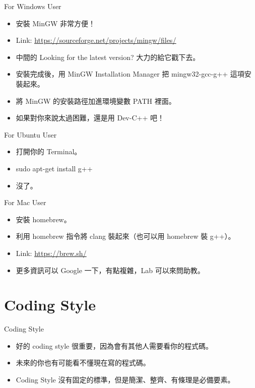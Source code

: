 \documentclass[t]{beamer}
\begin{document}
\begin{frame}{For Windows User}
  \begin{itemize}
    \item 安裝 MinGW 非常方便！
    \item Link: \href{https://sourceforge.net/projects/mingw/files/}{\underline{https://sourceforge.net/projects/mingw/files/}}
    \item 中間的 Looking for the latest version? 大力的給它戳下去。
    \item 安裝完成後，用 MinGW Installation Manager 把 mingw32-gcc-g++ 這項安裝起來。
    \item 將 MinGW 的安裝路徑加進環境變數 PATH 裡面。
    \item 如果對你來說太過困難，還是用 Dev-C++ 吧！
  \end{itemize}
\end{frame}

\begin{frame}{For Ubuntu User}
  \begin{itemize}
    \item 打開你的 Terminal。
    \item sudo apt-get install g++
    \item 沒了。
  \end{itemize}
\end{frame}

\begin{frame}{For Mac User}
  \begin{itemize}
    \item 安裝 homebrew。
    \item 利用 homebrew 指令將 clang 裝起來（也可以用 homebrew 裝 g++）。
    \item Link: \href{https://brew.sh/}{\underline{https://brew.sh/}}
    \item 更多資訊可以 Google 一下，有點複雜，Lab 可以來問助教。
  \end{itemize}
\end{frame}

\section{Coding Style}
\begin{frame}{Coding Style}
  \begin{itemize}
    \item 好的 coding style 很重要，因為會有其他人需要看你的程式碼。
    \item 未來的你也有可能看不懂現在寫的程式碼。
    \item Coding Style 沒有固定的標準，但是簡潔、整齊、有條理是必備要素。
  \end{itemize}
\end{frame}
\end{document}
